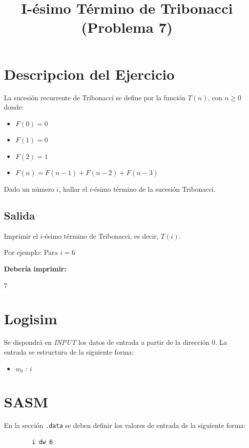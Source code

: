 \documentclass{article}
\title{I-ésimo Término de Tribonacci (Problema 7)}
\begin{document}
	
	\maketitle
	
	\section{Descripcion del Ejercicio}
	
	
	La sucesión recurrente de Tribonacci se define por la función $T(n)$, con $n \geq 0$ donde:
	\begin{itemize}
		\item $F(0) = 0$
		\item $F(1) = 0$
		\item $F(2) = 1$
		\item $F(n) = F(n-1) + F(n-2) + F(n-3)$
	\end{itemize}
	
	Dado un número $i$, hallar el $i$-ésimo término de la sucesión Tribonacci.
	
	\subsection*{Salida}
	
	Imprimir el $i$-ésimo término de Tribonacci, es decir, $T(i)$.
	
	Por ejemplo: Para $i=6$
	
	\textbf{Debería imprimir:}
	
	7
	
	\section*{Logisim}
	
	Se dispondrá en \textit{INPUT} los datos de entrada a partir de la dirección $0$. La entrada se estructura de la siguiente forma:
	
	\begin{itemize}
		\item $w_0$ : $i$
	\end{itemize}
	
	\section*{SASM}
	
	En la sección \texttt{.data} se deben definir los valores de entrada de la siguiente forma:
	
	\begin{verbatim}
		i dw 6
	\end{verbatim}
	
\end{document}
